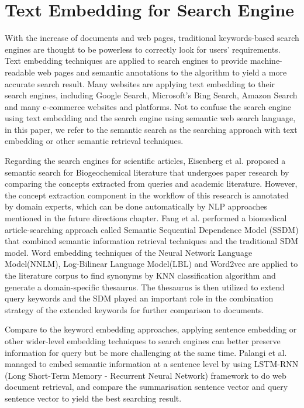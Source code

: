 \section{Text Embedding for Search Engine}
With the increase of documents and web pages, traditional keywords-based search engines are thought to be powerless to correctly look for users' requirements.
Text embedding techniques are applied to search engines to provide machine-readable web pages and semantic annotations to the algorithm to yield a more accurate search result.
Many websites are applying text embedding to their search engines, including Google Search, Microsoft's Bing Search, Amazon Search and many e-commerce websites and platforms.
Not to confuse the search engine using text embedding and the search engine using semantic web search language, in this paper, we refer to the semantic search as the searching approach with text embedding or other semantic retrieval techniques. 

Regarding the search engines for scientific articles, Eisenberg et al.\cite{eisenberg2017} proposed a semantic search for Biogeochemical literature that undergoes paper research by comparing the concepts extracted from queries and academic literature.
However, the concept extraction component in the workflow of this research is annotated by domain experts, which can be done automatically by NLP approaches mentioned in the future directions chapter.
Fang et al.\cite{fang2018} performed a biomedical article-searching approach called Semantic Sequential Dependence Model (SSDM) that combined semantic information retrieval techniques and the traditional SDM model.
Word embedding techniques of the Neural Network Language Model(NNLM)\cite{bengio2000}, Log-Bilinear Language Model(LBL)\cite{mnih2007} and Word2vec are applied to the literature corpus to find synonyms by KNN classification algorithm and generate a domain-specific thesaurus.
The thesaurus is then utilized to extend query keywords and the SDM played an important role in the combination strategy of the extended keywords for further comparison to documents.

Compare to the keyword embedding approaches, applying sentence embedding or other wider-level embedding techniques to search engines can better preserve information for query but be more challenging at the same time.
Palangi et al.\cite{palangi2016} managed to embed semantic information at a sentence level by using LSTM-RNN (Long Short-Term Memory - Recurrent Neural Network) framework to do web document retrieval, and compare the summarisation sentence vector and query sentence vector to yield the best searching result.


